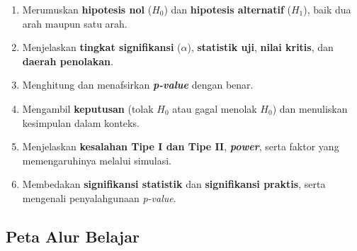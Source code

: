 \documentclass[
  indonesian,
  letterpaper,
]{book}
\providecommand{\tightlist}{%
  \setlength{\itemsep}{0pt}\setlength{\parskip}{0pt}}
\begin{document}
\begin{enumerate}
\def\labelenumi{\arabic{enumi}.}
\tightlist
\item
  Merumuskan \textbf{hipotesis nol} (\(H_0\)) dan \textbf{hipotesis
  alternatif} (\(H_1\)), baik dua arah maupun satu arah.
\item
  Menjelaskan \textbf{tingkat signifikansi} (\(\alpha\)),
  \textbf{statistik uji}, \textbf{nilai kritis}, dan \textbf{daerah
  penolakan}.
\item
  Menghitung dan menafsirkan \textbf{\emph{p-value}} dengan benar.
\item
  Mengambil \textbf{keputusan} (tolak \(H_0\) atau gagal menolak
  \(H_0\)) dan menuliskan kesimpulan dalam konteks.
\item
  Menjelaskan \textbf{kesalahan Tipe I dan Tipe II},
  \textbf{\emph{power}}, serta faktor yang memengaruhinya melalui
  simulasi.
\item
  Membedakan \textbf{signifikansi statistik} dan \textbf{signifikansi
  praktis}, serta mengenali penyalahgunaan \emph{p-value}.
\end{enumerate}

\subsection{Peta Alur Belajar}\label{peta-alur-belajar}
\end{document}
